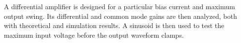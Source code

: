 A differential amplifier is designed for a particular bias current and maximum output swing.
Its differential and common mode gains are then analyzed, both with theoretical and simulation results.
A sinusoid is then used to test the maximum input voltage before the output waveform clamps.
